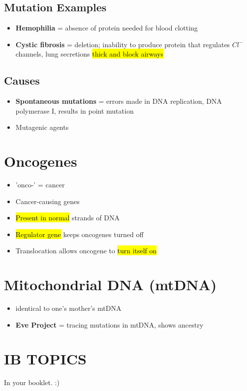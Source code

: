 \documentclass[a4paper,12pt]{article}
\begin{document}
\subsection{Mutation Examples}
\begin{itemize}
    \item{\textbf{Hemophilia} = absence of protein needed for blood clotting}
    \item{\textbf{Cystic fibrosis} = deletion; inability to produce protein that regulates $Cl^-$ channels, lung secretions \hl{thick and block airways}}
\end{itemize}

\subsection{Causes}
\begin{itemize}
    \item{\textbf{Spontaneous mutations} = errors made in DNA replication, DNA polymerase I, results in point mutation}
    \item{Mutagenic agents}
\end{itemize}

\section{Oncogenes}
\begin{itemize}
    \item{'onco-' = cancer}
    \item{Cancer-causing genes}
    \item{\hl{Present in normal} strands of DNA}
    \item{\hl{Regulator gene} keeps oncogenes turned off}
    \item{Translocation allows oncogene to \hl{turn itself on}}
\end{itemize}

\section{Mitochondrial DNA (mtDNA)}
\begin{itemize}
    \item{identical to one's mother's mtDNA}
    \item{\textbf{Eve Project} = tracing mutations in mtDNA, shows ancestry}
\end{itemize}

\pagebreak

\section{IB TOPICS}
In your booklet. :)
\end{document}
